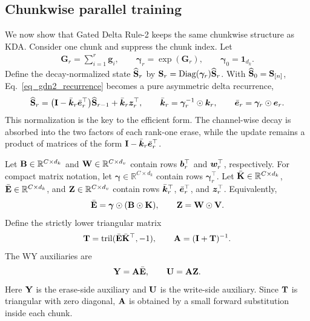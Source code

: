 \documentclass[10pt, logo, onecolumn, copyright]{nv}
\begin{document}
\subsection{Chunkwise parallel training}
\label{subsec_chunkwise_training}

We now show that Gated Delta Rule-2 keeps the same chunkwise structure as KDA. Consider one chunk and suppress the chunk index. Let
\begin{align}
    \boldsymbol{G}_r = \sum_{i=1}^{r}\boldsymbol{g}_i,
    \qquad
    \boldsymbol{\gamma}_r = \exp(\boldsymbol{G}_r),
    \qquad
    \boldsymbol{\gamma}_0 = \mathbf{1}_{d_k} .
\label{eq_gdn2_gamma}
\end{align}
Define the decay-normalized state $\widehat{{\mathbf{S}}}_r$ by ${\mathbf{S}}_r = \operatorname{Diag}(\boldsymbol{\gamma}_r)\widehat{{\mathbf{S}}}_r$. With $\widehat{{\mathbf{S}}}_0={\mathbf{S}}_{[n]}$, Eq.~\ref{eq_gdn2_recurrence} becomes a pure asymmetric delta recurrence,
\begin{align}
    \widehat{{\mathbf{S}}}_r
    = \bigl({\mathbf{I}} - \bar{{\bm{k}}}_r\bar{{\bm{e}}}_r^\top\bigr)\widehat{{\mathbf{S}}}_{r-1}
    + \bar{{\bm{k}}}_r{\bm{z}}_r^\top,
    \qquad
    \bar{{\bm{k}}}_r = \boldsymbol{\gamma}_r^{-1}\odot{\bm{k}}_r,
    \qquad
    \bar{{\bm{e}}}_r = \boldsymbol{\gamma}_r\odot{\bm{e}}_r .
\label{eq_gdn2_normalized_delta}
\end{align}
This normalization is the key to the efficient form. The channel-wise decay is absorbed into the two factors of each rank-one erase, while the update remains a product of matrices of the form ${\mathbf{I}} - \bar{{\bm{k}}}_r\bar{{\bm{e}}}_r^\top$.

Let ${\mathbf{B}}\in\mathbb{R}^{C\times d_k}$ and ${\mathbf{W}}\in\mathbb{R}^{C\times d_v}$ contain rows ${\bm{b}}_r^\top$ and ${\bm{w}}_r^\top$, respectively. For compact matrix notation, let $\boldsymbol{\gamma}\in\mathbb{R}^{C\times d_k}$ contain rows $\boldsymbol{\gamma}_r^\top$. Let $\bar{{\mathbf{K}}}\in\mathbb{R}^{C\times d_k}$, $\bar{{\mathbf{E}}}\in\mathbb{R}^{C\times d_k}$, and ${\mathbf{Z}}\in\mathbb{R}^{C\times d_v}$ contain rows $\bar{{\bm{k}}}_r^\top$, $\bar{{\bm{e}}}_r^\top$, and ${\bm{z}}_r^\top$. Equivalently,
\begin{align}
    \bar{{\mathbf{E}}}
    =
    \boldsymbol{\gamma}\odot({\mathbf{B}}\odot{\mathbf{K}}),
    \qquad
    {\mathbf{Z}}
    =
    {\mathbf{W}}\odot{\mathbf{V}} .
\label{eq_gdn2_gate_matrices}
\end{align}
Define the strictly lower triangular matrix
\begin{align}
    {\mathbf{T}} = \operatorname{tril}(\bar{{\mathbf{E}}}\bar{{\mathbf{K}}}^\top, -1),
    \qquad
    {\mathbf{A}} = ({\mathbf{I}} + {\mathbf{T}})^{-1} .
\label{eq_gdn2_wy_matrix}
\end{align}
The WY auxiliaries are
\begin{align}
    {\mathbf{Y}} = {\mathbf{A}}\bar{{\mathbf{E}}},
    \qquad
    {\mathbf{U}} = {\mathbf{A}}{\mathbf{Z}} .
\label{eq_gdn2_wy_aux}
\end{align}
Here ${\mathbf{Y}}$ is the erase-side auxiliary and ${\mathbf{U}}$ is the write-side auxiliary. Since ${\mathbf{T}}$ is triangular with zero diagonal, ${\mathbf{A}}$ is obtained by a small forward substitution inside each chunk.
\end{document}
